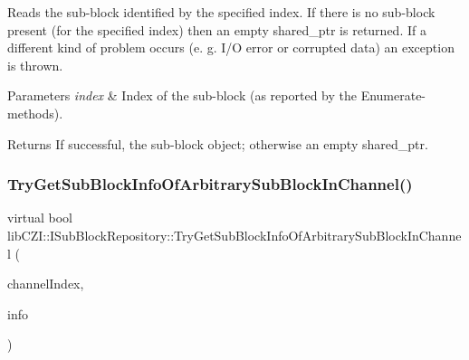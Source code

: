 Reads the sub-\/block identified by the specified index. If there is no sub-\/block present (for the specified index) then an empty shared\+\_\+ptr is returned. If a different kind of problem occurs (e. g. I/O error or corrupted data) an exception is thrown. 
\begin{DoxyParams}{Parameters}
{\em index} & Index of the sub-\/block (as reported by the Enumerate-\/methods). \\
\hline
\end{DoxyParams}
\begin{DoxyReturn}{Returns}
If successful, the sub-\/block object; otherwise an empty shared\+\_\+ptr. 
\end{DoxyReturn}
\mbox{\label{classlib_c_z_i_1_1_i_sub_block_repository_ae557269ff1dcc03bacc21610b17d2104}} 
\subsubsection{\texorpdfstring{Try\+Get\+Sub\+Block\+Info\+Of\+Arbitrary\+Sub\+Block\+In\+Channel()}{TryGetSubBlockInfoOfArbitrarySubBlockInChannel()}}
{\footnotesize\ttfamily virtual bool lib\+C\+Z\+I\+::\+I\+Sub\+Block\+Repository\+::\+Try\+Get\+Sub\+Block\+Info\+Of\+Arbitrary\+Sub\+Block\+In\+Channel (\begin{DoxyParamCaption}\item[{int}]{channel\+Index,  }\item[{\hyperlink{structlib_c_z_i_1_1_sub_block_info}{Sub\+Block\+Info} \&}]{info }\end{DoxyParamCaption})\hspace{0.3cm}{\ttfamily [pure virtual]}}


